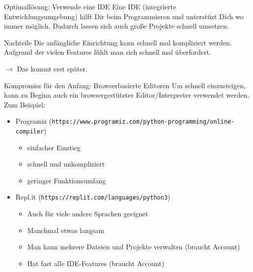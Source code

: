 \documentclass[algorithm,pgfplots,colortheme=dark]{cuzbeamer}
\begin{document}
\begin{frame}
\begin{block}{Optimallösung: Verwende eine IDE}
	\vspace{2pt}	
	Eine IDE (integrierte Entwicklungsumgebung) hilft Dir beim Programmieren und unterstüzt Dich wo immer möglich. Dadurch lassen sich auch große Projekte schnell umsetzen. 
\end{block}
\begin{alertblock}{Nachteile}
	\vspace{2pt}
	Die anfängliche Einrichtung kann schnell mal kompliziert werden. Aufgrund der vielen Features fühlt man sich schnell mal überfordert. 
	
	$\rightarrow$ Das kommt erst später.	
\end{alertblock}
\end{frame}


\begin{frame}
\begin{block}{Kompromiss für den Anfang: Browserbasierte Editoren}
\vspace{2pt}
Um schnell einzusteigen, kann zu Beginn auch ein browsergestützter Editor/Interpreter verwendet werden. Zum Beispiel: 
\pause
\begin{itemize}
	\item Programiz (\texttt{https://www.programiz.com/python-programming/online-compiler})
	\begin{itemize}
		\item einfacher Einstieg
		\item schnell und unkompliziert
		\item geringer Funktionsumfang
	\end{itemize}
	\pause
	\item Repl.it (\texttt{https://replit.com/languages/python3})
	\begin{itemize}
		\item Auch für viele andere Sprachen geeignet
		\item Manchmal etwas langsam
		\item Man kann mehrere Dateien und Projekte verwalten (braucht Account) 
		\item Hat fast alle IDE-Features (braucht Account)
	\end{itemize}
\end{itemize}
\end{block}

\end{frame}
\end{document}
